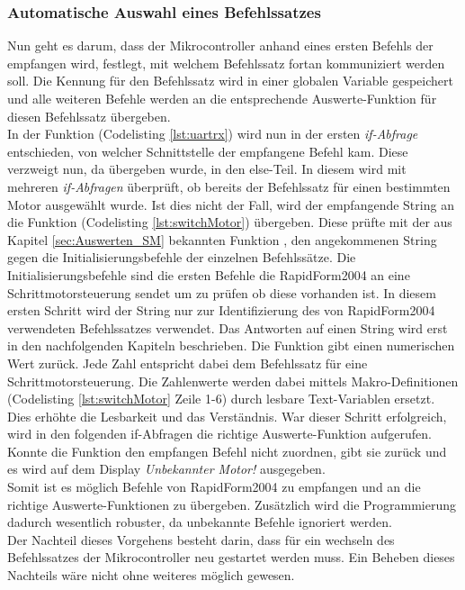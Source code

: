 \subsubsection{Automatische Auswahl eines Befehlssatzes}
\label{sec:AutoProtokoll}
Nun geht es darum, dass der Mikrocontroller anhand eines ersten Befehls der empfangen wird, festlegt, mit welchem Befehlssatz fortan kommuniziert werden soll. Die Kennung für den Befehlssatz wird in einer globalen Variable gespeichert und alle weiteren Befehle werden an die entsprechende Auswerte-Funktion für diesen Befehlssatz übergeben.\\
In der Funktion (Codelisting \ref{lst:uartrx}) wird nun in der ersten \emph{if-Abfrage} entschieden, von welcher Schnittstelle der empfangene Befehl kam. Diese verzweigt nun, da  übergeben wurde, in den else-Teil. In diesem wird mit mehreren \emph{if-Abfragen} überprüft, ob bereits der Befehlssatz für einen bestimmten Motor ausgewählt wurde. Ist dies nicht der Fall, wird der empfangende String an die Funktion (Codelisting \ref{lst:switchMotor}) übergeben. Diese prüfte mit der aus Kapitel \ref{sec:Auswerten_SM} bekannten Funktion , den angekommenen String gegen die Initialisierungsbefehle der einzelnen Befehlssätze. Die Initialisierungsbefehle sind die ersten Befehle die RapidForm2004 an eine Schrittmotorsteuerung sendet um zu prüfen ob diese vorhanden ist. In diesem ersten Schritt wird der String nur zur Identifizierung des von RapidForm2004 verwendeten Befehlssatzes verwendet. Das Antworten auf einen String wird erst in den nachfolgenden Kapiteln beschrieben. Die Funktion  gibt einen numerischen Wert zurück. Jede Zahl entspricht dabei dem Befehlssatz für eine Schrittmotorsteuerung. Die Zahlenwerte werden dabei mittels Makro-Definitionen (Codelisting \ref{lst:switchMotor} Zeile 1-6) durch lesbare Text-Variablen ersetzt. Dies erhöhte die Lesbarkeit und das Verständnis. War dieser Schritt erfolgreich, wird in den folgenden if-Abfragen die richtige Auswerte-Funktion aufgerufen. Konnte die Funktion  den empfangen Befehl nicht zuordnen, gibt sie  zurück und es wird auf dem Display \emph{Unbekannter Motor!} ausgegeben.\\
Somit ist es möglich Befehle von RapidForm2004 zu empfangen und an die richtige Auswerte-Funktionen zu übergeben. Zusätzlich wird die Programmierung dadurch wesentlich robuster, da unbekannte Befehle ignoriert werden.\\
Der Nachteil dieses Vorgehens besteht darin, dass für ein wechseln des Befehlssatzes der Mikrocontroller neu gestartet werden muss. Ein Beheben dieses Nachteils wäre nicht ohne weiteres möglich gewesen.

